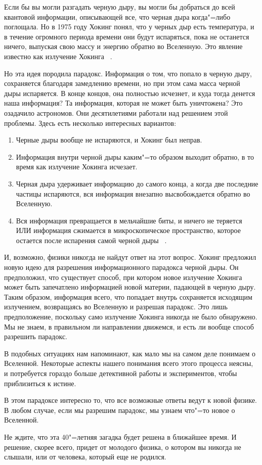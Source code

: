\documentclass[bachelor, och, referat]{SCWorks}
\begin{document}
Если бы вы могли разгадать черную дыру, вы могли бы добраться до всей квантовой информации, описывающей все, что черная дыра когда"=либо поглощала. Но в 1975 году Хокинг понял, что у черных дыр есть температура, и в течение огромного периода времени они будут испаряться, пока не останется ничего, выпуская свою массу и энергию обратно во Вселенную. Это явление известно как излучение Хокинга ~\cite{4}.

Но эта идея породила парадокс. Информация о том, что попало в черную дыру, сохраняется благодаря замедлению времени, но при этом сама масса черной дыры испаряется. В конце концов, она полностью исчезнет, и куда тогда денется наша информация? Та информация, которая не может быть уничтожена? Это озадачило астрономов. Они десятилетиями работали над решением этой проблемы. Здесь есть несколько интересных вариантов:

\begin{enumerate}
\item Черные дыры вообще не испаряются, и Хокинг был неправ.
\item Информация внутри черной дыры каким"=то образом выходит обратно, в то время как излучение Хокинга исчезает.
\item Черная дыра удерживает информацию до самого конца, а когда две последние частицы испаряются, вся информация внезапно высвобождается обратно во Вселенную.
\item Вся информация превращается в мельчайшие биты, и ничего не теряется ИЛИ информация сжимается в микроскопическое пространство, которое остается после испарения самой черной дыры ~\cite{5}.
\end{enumerate}

И, возможно, физики никогда не найдут ответ на этот вопрос. Хокинг предложил новую идею для разрешения информационного парадокса черной дыры. Он предположил, что существует способ, при котором новое излучение Хокинга может быть запечатлено информацией новой материи, падающей в черную дыру. Таким образом, информация всего, что попадает внутрь сохраняется исходящим излучением, возвращаясь во Вселенную и разрешая парадокс. Это лишь предположение, поскольку само излучение Хокинга никогда не было обнаружено. Мы не знаем, в правильном ли направлении движемся, и есть ли вообще способ разрешить парадокс.

В подобных ситуациях нам напоминают, как мало мы на самом деле понимаем о Вселенной. Некоторые аспекты нашего понимания всего этого процесса неясны, и потребуется гораздо больше детективной работы и экспериментов, чтобы приблизиться к истине.

\conclusion

В этом парадоксе интересно то, что все возможные ответы ведут к новой физике. В любом случае, если мы разрешим парадокс, мы узнаем что"=то новое о Вселенной.

Не ждите, что эта 40"=летняя загадка будет решена в ближайшее время. И решение, скорее всего, придет от молодого физика, о котором вы никогда не слышали, или от человека, который еще не родился.



\end{document}
